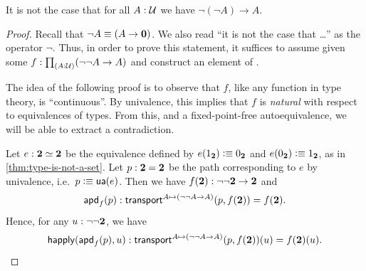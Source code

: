 \begin{thm}\label{thm:not-dneg}
  It is not the case that for all $A:\mathcal{U}$ we have $\neg(\neg A) \to A$.
\end{thm}
\begin{proof}
  Recall that $\neg A \equiv (A\to\mathbf{0})$.
  We also read ``it is not the case that \dots'' as the operator $\neg$.
  Thus, in order to prove this statement, it suffices to assume given some $f:\prd{A:\UU} (\neg\neg A \to A)$ and construct an element of \emptyt.

  The idea of the following proof is to observe that $f$, like any function in type theory, is ``continuous''.
  By univalence, this implies that $f$ is \emph{natural} with respect to equivalences of types.
  From this, and a fixed-point-free autoequivalence, we will be able to extract a contradiction.

  Let $e:\mathbf{2} \simeq \mathbf{2}$ be the equivalence defined by $e({1_{\mathbf{2}}})\vcentcolon\equiv{0_{\ensuremath{\mathbf{2}}}}$ and $e({0_{\mathbf{2}}})\vcentcolon\equiv{1_{\ensuremath{\mathbf{2}}}}$, as in \cref{thm:type-is-not-a-set}.
  Let $p:\mathbf{2}=\mathbf{2}$ be the path corresponding to $e$ by univalence, i.e.\ $p\vcentcolon\equiv \mathsf{ua}(e)$.
  Then we have $f(\mathbf{2}) : \neg\neg\mathbf{2} \to\mathbf{2}$ and
  \[\mathsf{apd}_{f}\mathopen{}\left(p\right)\mathclose{} : \mathsf{transport}^{A\mapsto (\neg\neg A \to A)}(p,f(\mathbf{2})) = f(\mathbf{2}).\]
  Hence, for any $u:\neg\neg\mathbf{2}$, we have
  \[\mathsf{happly}(\mathsf{apd}_{f}\mathopen{}\left(p\right)\mathclose{},u) : \mathsf{transport}^{A\mapsto (\neg\neg A \to A)}(p,f(\mathbf{2}))(u) = f(\mathbf{2})(u).\]


\end{proof}
